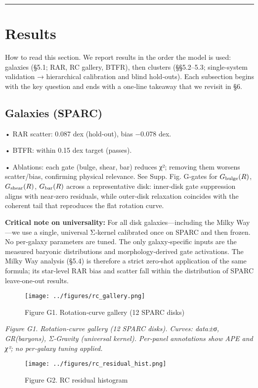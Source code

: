 \documentclass[11pt,a4paper]{article}
\begin{document}
\medskip\hrule\medskip


\section{Results}


How to read this section. We report results in the order the model is used: galaxies (§5.1; RAR, RC gallery, BTFR), then clusters (§§5.2–5.3; single‑system validation → hierarchical calibration and blind hold‑outs). Each subsection begins with the key question and ends with a one‑line takeaway that we revisit in §6.


\subsection{Galaxies (SPARC)}


• RAR scatter: 0.087 dex (hold‑out), bias −0.078 dex.  

• BTFR: within 0.15 dex target (passes).  

• Ablations: each gate (bulge, shear, bar) reduces χ²; removing them worsens scatter/bias, confirming physical relevance. See Supp. Fig. G‑gates for $G_{\rm bulge}(R)$, $G_{\rm shear}(R)$, $G_{\rm bar}(R)$ across a representative disk: inner‑disk gate suppression aligns with near‑zero residuals, while outer‑disk relaxation coincides with the coherent tail that reproduces the flat rotation curve.


\textbf{Critical note on universality:} For all disk galaxies—including the Milky Way—we use a single, universal Σ‑kernel calibrated once on SPARC and then frozen. No per‑galaxy parameters are tuned. The only galaxy‑specific inputs are the measured baryonic distributions and morphology‑derived gate activations. The Milky Way analysis (§5.4) is therefore a strict zero‑shot application of the same formula; its star‑level RAR bias and scatter fall within the distribution of SPARC leave‑one‑out results.


\begin{figure}[h]
\centering
\texttt{[image: ../figures/rc\_gallery.png]}
\caption{Figure G1. Rotation‑curve gallery (12 SPARC disks)}
\end{figure}


\textit{Figure G1. Rotation‑curve gallery (12 SPARC disks). Curves: data±σ, GR(baryons), Σ‑Gravity (universal kernel). Per‑panel annotations show APE and χ²; no per‑galaxy tuning applied.}


\begin{figure}[h]
\centering
\texttt{[image: ../figures/rc\_residual\_hist.png]}
\caption{Figure G2. RC residual histogram}
\end{figure}
\end{document}

